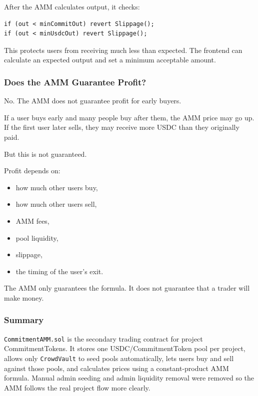 \documentclass[11pt,a4paper]{article}
\begin{document}
After the AMM calculates output, it checks:

\begin{lstlisting}
if (out < minCommitOut) revert Slippage();
if (out < minUsdcOut) revert Slippage();
\end{lstlisting}

This protects users from receiving much less than expected. The frontend can calculate an expected output and set a minimum acceptable amount.

\subsubsection{Does the AMM Guarantee Profit?}

No. The AMM does not guarantee profit for early buyers.

If a user buys early and many people buy after them, the AMM price may go up. If the first user later sells, they may receive more USDC than they originally paid.

But this is not guaranteed.

Profit depends on:

\begin{itemize}
  \item how much other users buy,
  \item how much other users sell,
  \item AMM fees,
  \item pool liquidity,
  \item slippage,
  \item the timing of the user's exit.
\end{itemize}

The AMM only guarantees the formula. It does not guarantee that a trader will make money.

\subsubsection{Summary}

\texttt{CommitmentAMM.sol} is the secondary trading contract for project CommitmentTokens. It stores one USDC/CommitmentToken pool per project, allows only \texttt{CrowdVault} to seed pools automatically, lets users buy and sell against those pools, and calculates prices using a constant-product AMM formula. Manual admin seeding and admin liquidity removal were removed so the AMM follows the real project flow more clearly.
\end{document}
